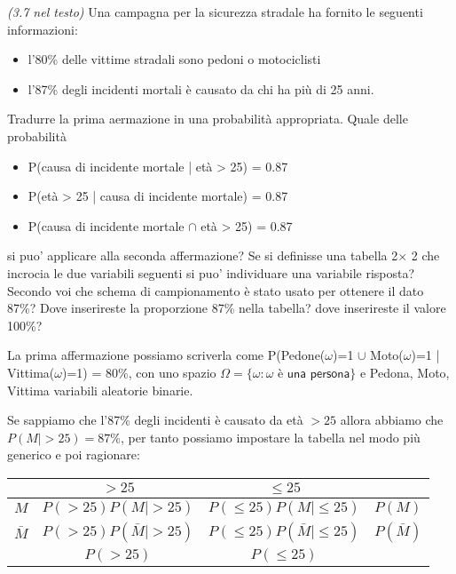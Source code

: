 \begin{exercise}{\emph{(3.7 nel testo)}}
  Una campagna per la sicurezza stradale ha fornito le seguenti
  informazioni:
  \begin{itemize}
  \item l'80\% delle vittime stradali sono pedoni o motociclisti
  \item l'87\% degli incidenti mortali \`e causato da chi ha pi\`u di
    25 anni.
  \end{itemize}
  Tradurre la prima aermazione in una probabilit\`a appropriata. Quale
  delle probabilit\`a
\begin{itemize}
\item P(causa di incidente mortale | et\`a > 25) = 0.87
\item P(et\`a > 25 | causa di incidente mortale) = 0.87
\item P(causa di incidente mortale $\cap$ et\`a > 25) = 0.87
\end{itemize}
si puo' applicare alla seconda affermazione?  Se si definisse una
tabella 2$\times$ 2 che incrocia le due variabili seguenti si puo'
individuare una variabile risposta? Secondo voi che schema di
campionamento \`e stato usato per ottenere il dato 87\%? Dove
inserireste la proporzione 87\% nella tabella? dove inserireste il
valore 100\%?
\end{exercise}
La prima affermazione possiamo scriverla come P(Pedone($\omega$)=1 $\cup$
Moto($\omega$)=1 | Vittima($\omega$)=1) = 80\%, con uno spazio $\Omega =
\{ \omega : \omega \textsf{ \`e una persona} \}$ e Pedona, Moto,
Vittima variabili aleatorie binarie.

Se sappiamo che l'87\% degli incidenti \`e causato da et\`a $> 25$
allora abbiamo che $P(M| >25) = 87\%$, per tanto possiamo impostare la
tabella nel modo pi\`u generico e poi ragionare:
  \begin{table}[h]              %
    \centering
    \begin{tabular}{|c|c|c|c|}
      \hline
      & $>25$ & $\leq 25$ &\\\hline
      $M$ & $P(>25)P(M| >25)$ & $P(\leq25)P(M|\leq25)$ & $P(M)$ \\
      $\bar{M}$ & $P(>25)P(\bar{M}| >25)$ &
      $P(\leq25)P(\bar{M}|\leq25)$ & $P(\bar{M})$ \\
      \hline
      & $P(>25)$ & $P(\leq 25)$ &\\
      \hline
    \end{tabular}
  \end{table}

